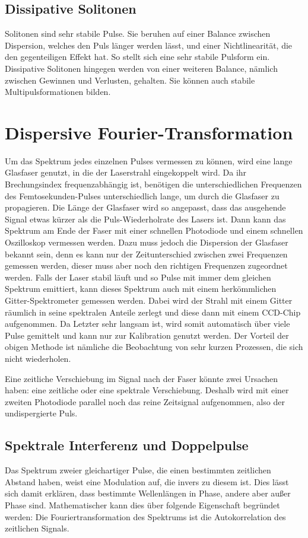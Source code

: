 \documentclass[bachelor,       %
               twoside,        %
               BCOR10mm,       %
               english,ngerman, %
               ]{GAUBM}
\begin{document}
\subsection{Dissipative Solitonen}
Solitonen sind sehr stabile Pulse.
Sie beruhen auf einer Balance zwischen Dispersion, welches den Puls länger werden lässt, und einer Nichtlinearität, die den gegenteiligen Effekt hat.
So stellt sich eine sehr stabile Pulsform ein.
Dissipative Solitonen hingegen werden von einer weiteren Balance, nämlich zwischen Gewinnen und Verlusten, gehalten.
Sie können auch stabile Multipulsformationen bilden.


\section{Dispersive Fourier-Transformation}
Um das Spektrum jedes einzelnen Pulses vermessen zu können, wird eine lange Glasfaser genutzt, in die der Laserstrahl eingekoppelt wird.
Da ihr Brechungsindex frequenzabhängig ist, benötigen die unterschiedlichen Frequenzen des Femtosekunden-Pulses unterschiedlich lange, um durch die Glasfaser zu propagieren.
Die Länge der Glasfaser wird so angepasst, dass das ausgehende Signal etwas kürzer als die Puls-Wiederholrate des Lasers ist.
Dann kann das Spektrum am Ende der Faser mit einer schnellen Photodiode und einem schnellen Oszilloskop vermessen werden.
Dazu muss jedoch die Dispersion der Glasfaser bekannt sein, denn es kann nur der Zeitunterschied zwischen zwei Frequenzen gemessen werden, dieser muss aber noch den richtigen Frequenzen zugeordnet werden.
Falls der Laser stabil läuft und so Pulse mit immer dem gleichen Spektrum emittiert, kann dieses Spektrum auch mit einem herkömmlichen Gitter-Spektrometer gemessen werden.
Dabei wird der Strahl mit einem Gitter räumlich in seine spektralen Anteile zerlegt und diese dann mit einem CCD-Chip aufgenommen.
Da Letzter sehr langsam ist, wird somit automatisch über viele Pulse gemittelt und kann nur zur Kalibration genutzt werden.
Der Vorteil der obigen Methode ist nämliche die Beobachtung von sehr kurzen Prozessen, die sich nicht wiederholen.

Eine zeitliche Verschiebung im Signal nach der Faser könnte zwei Ursachen haben: eine zeitliche oder eine spektrale Verschiebung.
Deshalb wird mit einer zweiten Photodiode parallel noch das reine Zeitsignal aufgenommen, also der undispergierte Puls.

\subsection{Spektrale Interferenz und Doppelpulse}
Das Spektrum zweier gleichartiger Pulse, die einen bestimmten zeitlichen Abstand haben, weist eine Modulation auf, die invers zu diesem ist.
Dies lässt sich damit erklären, dass bestimmte Wellenlängen in Phase, andere aber außer Phase sind.
Mathematischer kann dies über folgende Eigenschaft begründet werden:
Die Fouriertransformation des Spektrums ist die Autokorrelation des zeitlichen Signals.
\end{document}
